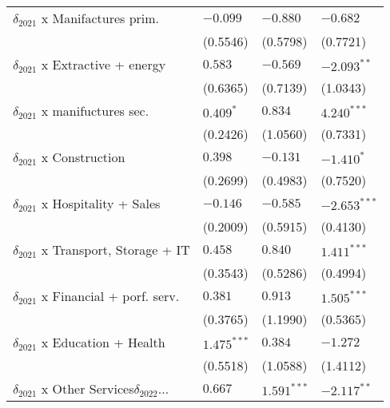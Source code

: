 \begin{tabular}{llll}
$\delta_{2021}$ x Manifactures prim.               &           $-0.099$ &           $-0.880$ &           $-0.682$ \\
                                                   &           (0.5546) &           (0.5798) &           (0.7721) \\
$\delta_{2021}$ x Extractive + energy              &            $0.583$ &           $-0.569$ &      $-2.093^{**}$ \\
                                                   &           (0.6365) &           (0.7139) &           (1.0343) \\
$\delta_{2021}$ x manifuctures sec.                &          $0.409^*$ &            $0.834$ &      $4.240^{***}$ \\
                                                   &           (0.2426) &           (1.0560) &           (0.7331) \\
$\delta_{2021}$ x Construction                     &            $0.398$ &           $-0.131$ &         $-1.410^*$ \\
                                                   &           (0.2699) &           (0.4983) &           (0.7520) \\
$\delta_{2021}$ x Hospitality + Sales              &           $-0.146$ &           $-0.585$ &     $-2.653^{***}$ \\
                                                   &           (0.2009) &           (0.5915) &           (0.4130) \\
$\delta_{2021}$ x Transport, Storage + IT          &            $0.458$ &            $0.840$ &      $1.411^{***}$ \\
                                                   &           (0.3543) &           (0.5286) &           (0.4994) \\
$\delta_{2021}$ x Financial + porf. serv.          &            $0.381$ &            $0.913$ &      $1.505^{***}$ \\
                                                   &           (0.3765) &           (1.1990) &           (0.5365) \\
$\delta_{2021}$ x Education + Health               &      $1.475^{***}$ &            $0.384$ &           $-1.272$ \\
                                                   &           (0.5518) &           (1.0588) &           (1.4112) \\
$\delta_{2021}$ x Other Services$\delta_{2022}$... &            $0.667$ &      $1.591^{***}$ &      $-2.117^{**}$ \\

\end{tabular}
